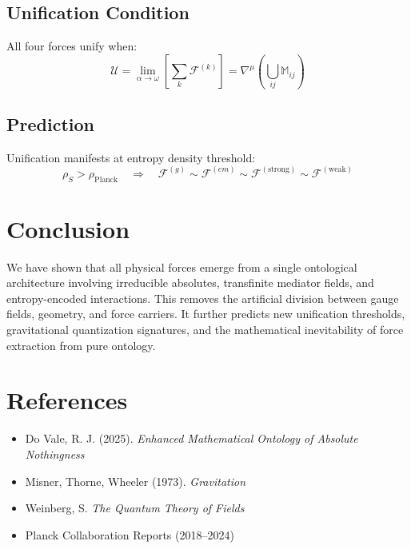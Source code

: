 \documentclass[11pt]{article}
\begin{document}
\subsection{Unification Condition}

All four forces unify when:
\[
\mathscr{U} = \lim_{\alpha \to \omega} \left[ \sum_k \mathscr{F}^{(k)} \right] = \nabla^\mu \left( \bigcup_{ij} \mathbb{M}_{ij} \right)
\]

\subsection{Prediction}

Unification manifests at entropy density threshold:
\[
\rho_S > \rho_{\text{Planck}} \quad \Rightarrow \quad \mathscr{F}^{(g)} \sim \mathscr{F}^{(em)} \sim \mathscr{F}^{(\text{strong})} \sim \mathscr{F}^{(\text{weak})}
\]

\section{Conclusion}

We have shown that all physical forces emerge from a single ontological architecture involving irreducible absolutes, transfinite mediator fields, and entropy-encoded interactions. This removes the artificial division between gauge fields, geometry, and force carriers. It further predicts new unification thresholds, gravitational quantization signatures, and the mathematical inevitability of force extraction from pure ontology.

\section*{References}

\vspace{-1em}
\begin{itemize}
    \item Do Vale, R. J. (2025). \textit{Enhanced Mathematical Ontology of Absolute Nothingness}
    \item Misner, Thorne, Wheeler (1973). \textit{Gravitation}
    \item Weinberg, S. \textit{The Quantum Theory of Fields}
    \item Planck Collaboration Reports (2018–2024)
\end{itemize}
\end{document}
